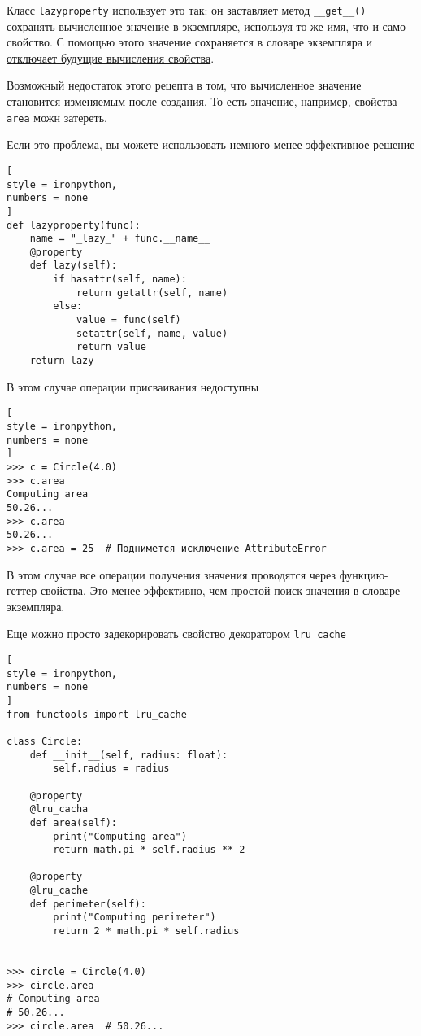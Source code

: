 \documentclass[%
	11pt,
	a4paper,
	utf8,
		]{article}
\begin{document}
Класс \texttt{lazyproperty} использует это так: он заставляет метод \verb|__get__()| сохранять вычисленное значение в экземпляре, используя то же имя, что и само свойство. С помощью этого значение сохраняется в словаре экземпляра и \underline{отключает будущие вычисления свойства}.

Возможный недостаток этого рецепта в том, что вычисленное значение становится изменяемым после создания. То есть значение, например, свойства \texttt{area} можн затереть.

Если это проблема, вы можете использовать немного менее эффективное решение \cite[]{beazley:python_cookbook-2019}
\begin{lstlisting}[
style = ironpython,
numbers = none
]
def lazyproperty(func):
    name = "_lazy_" + func.__name__
    @property
    def lazy(self):
        if hasattr(self, name):
            return getattr(self, name)
        else:
            value = func(self)
            setattr(self, name, value)
            return value
    return lazy
\end{lstlisting}

В этом случае операции присваивания недоступны
\begin{lstlisting}[
style = ironpython,
numbers = none
]
>>> c = Circle(4.0)
>>> c.area
Computing area
50.26...
>>> c.area
50.26...
>>> c.area = 25  # Поднимется исключение AttributeError
\end{lstlisting}

В этом случае все операции получения значения проводятся через функцию-геттер свойства. Это менее эффективно, чем простой поиск значения в словаре экземпляра.

Еще можно просто задекорировать свойство декоратором \texttt{lru\_cache}
\begin{lstlisting}[
style = ironpython,
numbers = none
]
from functools import lru_cache

class Circle:
    def __init__(self, radius: float):
        self.radius = radius
        
    @property
    @lru_cacha
    def area(self):
        print("Computing area")
        return math.pi * self.radius ** 2
        
    @property
    @lru_cache
    def perimeter(self):
        print("Computing perimeter")
        return 2 * math.pi * self.radius
        
        
>>> circle = Circle(4.0)
>>> circle.area
# Computing area
# 50.26...
>>> circle.area  # 50.26...
\end{lstlisting}
\end{document}
